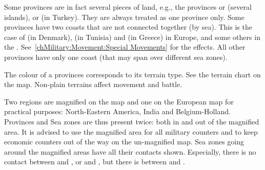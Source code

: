 \label{chBasics:Disconnected Provinces} Some
provinces are in fact several pieces of land, e.g., the provinces
\provinceCyclades or \provinceBaleares (several islands), or
\provinceCanakkale (in Turkey). They are always treated as one province only.
\label{chBasics:Multiple Coasts} Some provinces
have two coasts that are not connected together (by sea). This is the case of
\provinceSlesvig (in Denmark), \provinceIfriqiya (in Tunisia) and
\provinceHellas (in Greece) in Europe, and some others in the
\ROTW. See~\ref{chMilitary:Movement:Special Movements} for the effects.
\bparag All other provinces have only one coast (that may span over different
sea zones).

\aparag[Terrain] The colour of a provinces corresponds to its terrain
type. See the terrain chart on the map. Non-plain terrains affect movement and
battle.

\aparag Two regions are magnified on the \ROTW map and one on the European map
for practical purposes: North-Eastern America, India and Belgium-Holland.
\bparag Provinces and Sea zones are thus present twice: both in and out of the
magnified area. It is advised to use the magnified area for all military
counters and to keep economic counters out of the way on the un-magnified map.
\bparag Sea zones going around the magnified areas have all their contacts
shown. Especially, there is no contact between \seazoneLaquedives and
\seazoneQuarantiemes, or \seazoneCinquantiemes and \seazoneIndien, but there is
between \seazoneCinquantiemes and \seazoneQuarantiemes.

